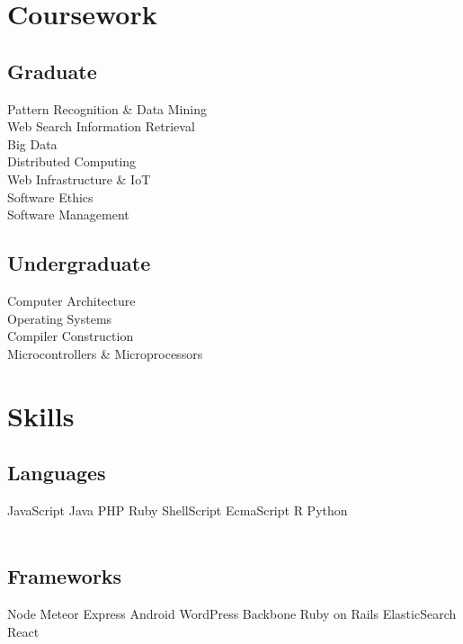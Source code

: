 \documentclass[]{deedy-resume-openfont}
\begin{document}
\begin{minipage}[t]{0.33\textwidth}

\section{Coursework}
\subsection{Graduate}
Pattern Recognition \& Data Mining \\
Web Search Information Retrieval \\
Big Data \\
Distributed Computing \\
Web Infrastructure \& IoT \\
Software Ethics \\
Software Management \\
\sectionsep

\subsection{Undergraduate}
Computer Architecture \\
Operating Systems \\
Compiler Construction \\
Microcontrollers \& Microprocessors \\
\sectionsep


\section{Skills}
\subsection{Languages}
JavaScript \textbullet{} Java \textbullet{} PHP \textbullet{} Ruby \textbullet{} ShellScript \textbullet{} EcmaScript \textbullet{} R \textbullet{} Python \\~\\
\subsection{Frameworks}
Node \textbullet{} Meteor \textbullet{} Express \textbullet{} Android \textbullet{} WordPress \textbullet{} Backbone \textbullet{} Ruby on Rails \textbullet{} ElasticSearch \textbullet{} React \\~\\

\end{minipage}
\end{document}
